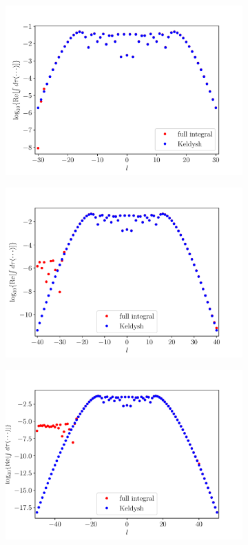 \begin{figure}
  \begin{subfigure}[b]{0.33\linewidth}
    \includegraphics[width=\textwidth]{figures/ch_ATI_SFA/1b2/l30n512WP20PG15MR35vsKeldysh.pdf}
  \end{subfigure}
  \begin{subfigure}[b]{0.33\linewidth}
    \includegraphics[width=\textwidth]{figures/ch_ATI_SFA/1b2/l40n512WP20PG15MR35vsKeldysh.pdf}
  \end{subfigure}
  \begin{subfigure}[b]{0.33\linewidth}
    \includegraphics[width=\textwidth]{figures/ch_ATI_SFA/1b2/l50n512WP40PG25MR35vsKeldysh.pdf}

\end{subfigure}
\end{figure}
